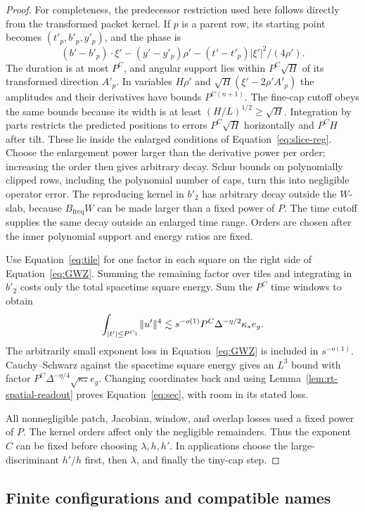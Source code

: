 \begin{proof}
For completeness, the predecessor restriction used here follows
directly from the transformed packet kernel.  If $p$ is a parent
row, its starting point becomes $(t'_p,b'_p,y'_p)$, and the phase is
\[
 (b'-b'_p)\cdot\xi'-(y'-y'_p)\rho'
                 -(t'-t'_p)|\xi'|^2/(4\rho').
\]
The duration is at most $P^C$, and angular support lies within
$P^C\sqrt H$ of its transformed direction $A'_p$.  In variables
$H\rho'$ and $\sqrt H(\xi'-2\rho'A'_p)$ the amplitudes and
their derivatives have bounds $P^{C(n+1)}$.  The fine-cap cutoff
obeys the same bounds because its width is at least
$(H/L)^{1/2}\ge\sqrt H$.  Integration by parts restricts the
predicted positions to errors $P^C\sqrt H$ horizontally and
$P^C H$ after tilt.  These lie inside the enlarged conditions of
Equation~\eqref{eq:slice-reg}.  Choose the enlargement power larger
than the derivative power per order; increasing the order then
gives arbitrary decay.  Schur bounds on polynomially clipped rows,
including the polynomial number of caps, turn this into negligible
operator error.  The reproducing kernel in $b'_2$ has arbitrary
decay outside the $W$-slab, because $B_{\mathrm{freq}}W$ can be
made larger than a fixed power of $P$.  The time cutoff supplies
the same decay outside an enlarged time range.  Orders are chosen
after the inner polynomial support and energy ratios are fixed.

Use Equation~\eqref{eq:tile} for one factor in each square on the
right side of Equation~\eqref{eq:GWZ}.  Summing the remaining
factor over tiles and integrating in $b'_2$ costs only the total
spacetime square energy.  Sum the $P^C$ time windows to obtain
\[
 \int_{|t'|\le P^{C_1}}\lVert u'\rVert^4
 \lesssim s^{-o(1)}P^C\Delta^{-\eta/2}\kappa_*e_g.
\]
The arbitrarily small exponent loss in Equation~\eqref{eq:GWZ}
is included in $s^{-o(1)}$.  Cauchy--Schwarz against the spacetime
square energy gives an $L^3$ bound with factor
$P^C\Delta^{-\eta/4}\sqrt{\kappa_*}e_g$.
Changing coordinates back and using
Lemma~\ref{lem:rt-spatial-readout} proves
Equation~\eqref{eq:sec}, with room in its stated loss.

All nonnegligible patch, Jacobian, window, and overlap losses used a
fixed power of $P$.  The kernel orders affect only the negligible
remainders.  Thus the exponent $C$ can be fixed before choosing
$\lambda,h,h'$.  In applications choose the large-discriminant
$h'/h$ first, then $\lambda$, and finally the tiny-cap step.
\end{proof}

\subsection{Finite configurations and compatible names}

